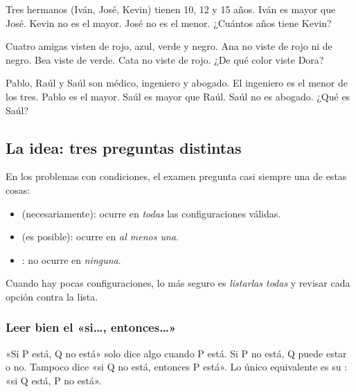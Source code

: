 \taller
{}
\begin{ejercicios}
\item Tres hermanos (Iván, José, Kevin) tienen 10, 12 y 15 años. Iván es mayor que José. Kevin no es el mayor. José no es el menor. ¿Cuántos años tiene Kevin? 
\item Cuatro amigas visten de rojo, azul, verde y negro. Ana no viste de rojo ni de negro. Bea viste de verde. Cata no viste de rojo. ¿De qué color viste Dora? 
\end{ejercicios}
\begin{ejercicios}
\item Pablo, Raúl y Saúl son médico, ingeniero y abogado. El ingeniero es el menor de los tres. Pablo es el mayor. Saúl es mayor que Raúl. Saúl no es abogado. ¿Qué es Saúl?
\end{ejercicios}

\bitacora


\subsection{La idea: tres preguntas distintas}
En los problemas con condiciones, el examen pregunta casi siempre una de estas cosas:
\begin{itemize}
  \item {} (necesariamente): ocurre en \emph{todas} las configuraciones válidas.
  \item {} (es posible): ocurre en \emph{al menos una}.
  \item {}: no ocurre en \emph{ninguna}.
\end{itemize}
Cuando hay pocas configuraciones, lo más seguro es \emph{listarlas todas} y revisar cada opción contra la lista.

\subsubsection{Leer bien el «si…, entonces…»}
«Si P está, Q no está» solo dice algo cuando P está. Si P no está, Q puede estar o no. Tampoco dice «si Q no está,
entonces P está». Lo único equivalente es su : «si Q está, P no está».

